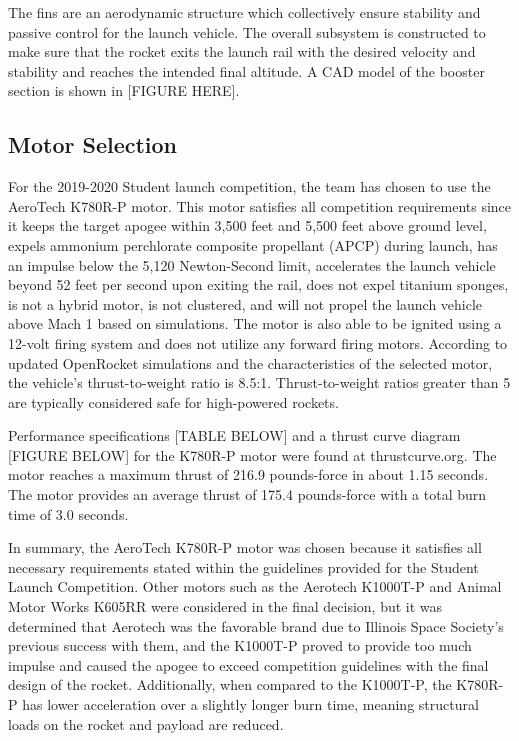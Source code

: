 The fins are an aerodynamic structure which collectively ensure stability and passive control for the launch vehicle. The overall subsystem is constructed to make sure that the rocket exits the launch rail with the desired velocity and stability and reaches the intended final altitude. A CAD model of the booster section is shown in [FIGURE HERE].

    \subsection{Motor Selection}
For the 2019-2020 Student launch competition, the team has chosen to use the AeroTech K780R-P motor. This motor satisfies all competition requirements since it keeps the target apogee within 3,500 feet and 5,500 feet above ground level, expels ammonium perchlorate composite propellant (APCP) during launch, has an impulse below the 5,120 Newton-Second limit, accelerates the launch vehicle beyond 52 feet per second upon exiting the rail, does not expel titanium sponges, is not a hybrid motor, is not clustered, and will not propel the launch vehicle above Mach 1 based on simulations. The motor is also able to be ignited using a 12-volt firing system and does not utilize any forward firing motors. According to updated OpenRocket simulations and the characteristics of the selected motor, the vehicle’s thrust-to-weight ratio is 8.5:1. Thrust-to-weight ratios greater than 5 are typically considered safe for high-powered rockets.

Performance specifications [TABLE BELOW] and a thrust curve diagram [FIGURE BELOW] for the K780R-P motor were found at thrustcurve.org. The motor reaches a maximum thrust of 216.9 pounds-force in about 1.15 seconds. The motor provides an average thrust of 175.4 pounds-force with a total burn time of 3.0 seconds.

In summary, the AeroTech K780R-P motor was chosen because it satisfies all necessary requirements stated within the guidelines provided for the Student Launch Competition. Other motors such as the Aerotech K1000T-P and Animal Motor Works K605RR were considered in the final decision, but it was determined that Aerotech was the favorable brand due to Illinois Space Society’s previous success with them, and the K1000T-P proved to provide too much impulse and caused the apogee to exceed competition guidelines with the final design of the rocket. Additionally, when compared to the K1000T-P, the K780R-P has lower acceleration over a slightly longer burn time, meaning structural loads on the rocket and payload are reduced.

